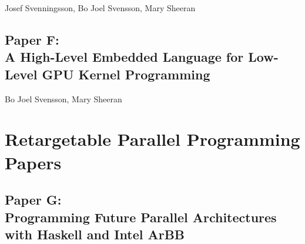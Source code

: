 \documentclass[a4paper]{book}
\newcommand{\paperF}{Paper F}
\newcommand{\paperFTitle}{A High-Level Embedded Language for Low-Level GPU Kernel Programming}
\newcommand{\paperG}{Paper G}
\newcommand{\paperGTitle}{Programming Future Parallel Architectures with Haskell and Intel ArBB}
\begin{document}
\begin{center} 
Josef Svenningsson, Bo Joel Svensson, Mary Sheeran 
\end{center}





% 
\cleardoublepage 


\section[\paperFTitle]{\paperF: \\ \paperFTitle}
\label{sec:paperF}




\begin{center} 
Bo Joel Svensson, Mary Sheeran
\end{center}








% 

\chapter{Retargetable Parallel Programming Papers}
\label{chap:ArBB}
% 
\cleardoublepage 


\section[\paperGTitle]{\paperG: \\ \paperGTitle}
\label{sec:paperG}

\end{document}
